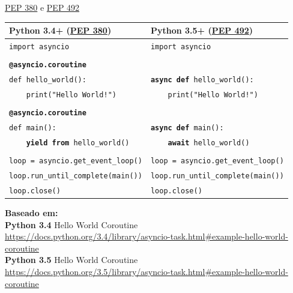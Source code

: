 \documentclass[12pt]{beamer}
\begin{document}
\begin{frame}[fragile]{\href{https://www.python.org/dev/peps/pep-0380/}{PEP 380} e \href{https://www.python.org/dev/peps/pep-0492/}{PEP 492}}
  \begin{table}
    \tiny{
    \begin{tabular}{ll}
      Python 3.4+ (\href{https://www.python.org/dev/peps/pep-0380/}{PEP 380}) & Python 3.5+ (\href{https://www.python.org/dev/peps/pep-0492/}{PEP 492})\\
      \midrule
      \verb|import asyncio| & \verb|import asyncio|\\
       & \\
      \textbf{\texttt{@asyncio.coroutine}} & \verb||\\
      \verb|def hello_world():| & \textbf{\texttt{async def}}\verb| hello_world():|\\
      \verb|    print("Hello World!")| & \verb|    print("Hello World!")|\\
       & \\
      \textbf{\texttt{@asyncio.coroutine}} & \verb||\\
      \verb|def main():| & \textbf{\texttt{async def}}\verb| main():|\\
      \verb|    |\textbf{\texttt{yield from}}\verb| hello_world()| & \verb|    |\textbf{\texttt{await}}\verb| hello_world()|\\
       & \\
      \verb|loop = asyncio.get_event_loop()| & \verb|loop = asyncio.get_event_loop()|\\
      \verb|loop.run_until_complete(main())| & \verb|loop.run_until_complete(main())|\\
      \verb|loop.close()| & \verb|loop.close()|\\
      \bottomrule
    \end{tabular}}
  \end{table}
  \begin{flushleft}
    \vspace{-0.25cm}
    \scriptsize{\textbf{Baseado em:}\\}
    \tiny{\textbf{Python 3.4} Hello World Coroutine\\
          \url{https://docs.python.org/3.4/library/asyncio-task.html#example-hello-world-coroutine}\\
          \textbf{Python 3.5} Hello World Coroutine\\
          \url{https://docs.python.org/3.5/library/asyncio-task.html#example-hello-world-coroutine}}
  \end{flushleft}
\end{frame}
\end{document}
